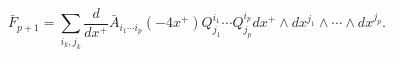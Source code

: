 \begin{equation}
 \bar F_{p+1} = 
 \sum_{i_k, j_k} \frac{d}{dx^+} \bar A_{i_1 \cdots i_p} (-4 x^+)
 Q^{i_1}_{j_1} \cdots  Q^{i_p}_{j_p} 
 dx^+ \wedge dx^{j_1} \wedge \cdots \wedge d x^{j_p} .
\end{equation} 
